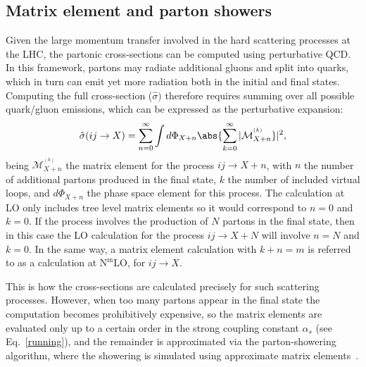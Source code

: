 \subsection{Matrix element and parton showers}
\label{subsec:parton_shower}
Given the large momentum transfer involved in the hard scattering processes at the LHC, the partonic cross-sections can be computed using perturbative QCD. In this framework, partons may radiate additional gluons and split into quarks, which in turn can emit yet more radiation both in the initial and final states. Computing the full cross-section ($\hat{\sigma})$ therefore requires summing over all possible quark/gluon emissions, which can be expressed as the perturbative expansion:
\begin{equation}
\hat{\sigma}(ij\rightarrow X) = \sum_{n=0}^{\infty}\int d\Phi_{X+n}\abs{\sum_{k=0}^{\infty}|\mathcal{M}_{X+n}^{^{(k)}}}|^2,
\end{equation}
being $\mathcal{M}_{X+n}^{^{(k)}}$ the matrix element for the process $ij \rightarrow X + n$, with $n$ the number of additional partons produced in the final state, $k$ the number of included virtual loops, and $d\Phi_{X+n}$ the phase space element for this process.
The calculation at LO only includes tree level matrix elements so it would correspond to $n=0$ and $k=0$. If the process involves the production of $N$ partons in the final state, then in this case the LO calculation for the process $ij \rightarrow X+N$ will involve $n=N$ and $k=0$.
In the same way, a matrix element calculation with $k + n = m$ is referred to as a calculation at $\text{N}^{\text{m}}$LO, for $ij \rightarrow X$.

This is how the cross-sections are calculated precisely for such scattering processes. However, when too many partons appear in the final state the computation becomes prohibitively expensive, so the matrix elements are evaluated only up to a certain order in the strong coupling constant
 $\alpha_{s}$ (see Eq.~\ref{running}), and the remainder is approximated via the parton-showering algorithm, where the showering is simulated using approximate matrix elements~\cite{FOX1980285}.

